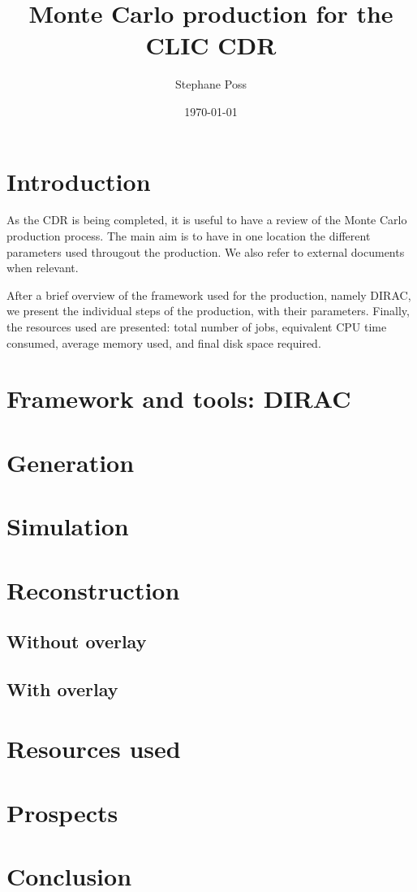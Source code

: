 \documentclass{article}
\author{Stephane Poss}
\title{Monte Carlo production for the CLIC CDR}
\date{\today}
\begin{document}
\maketitle
{}
\section{Introduction}
As the CDR is being completed, it is useful to have a review of the Monte Carlo production process. The main aim is to 
have in one location the different parameters used througout the production. We also refer to external documents when 
relevant. 

After a brief overview of the framework used for the production, namely DIRAC, we present the individual steps
of the production, with their parameters. Finally, the resources used are presented: total number of jobs, equivalent
CPU time consumed, average memory used, and final disk space required.

\section{Framework and tools: DIRAC}

\section{Generation}

\section{Simulation}

\section{Reconstruction}
\subsection{Without overlay}

\subsection{With overlay}

\section{Resources used}

\section{Prospects}
\section{Conclusion}
\end{document}
